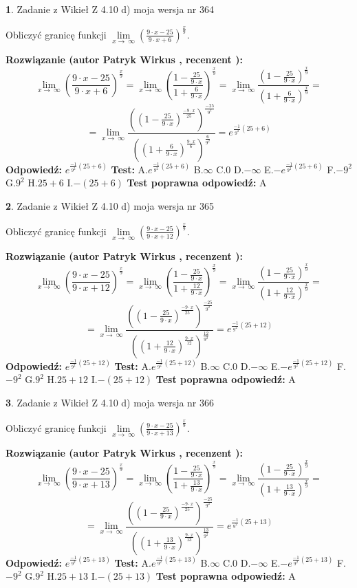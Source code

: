 \documentclass[12pt, a4paper]{article}
\theoremstyle{definition} %
\newtheorem{zad}{}
\newcommand{\zadStart}[1]{\begin{zad}#1\newline}
\newcommand{\zadStop}{\end{zad}}
\newcommand{\rozwStart}[2]{\noindent \textbf{Rozwiązanie (autor #1 , recenzent #2): }\newline}
\newcommand{\rozwStop}{\newline}
\newcommand{\odpStart}{\noindent \textbf{Odpowiedź:}\newline}
\newcommand{\odpStop}{\newline}
\newcommand{\testStart}{\noindent \textbf{Test:}\newline}
\newcommand{\testStop}{\newline}
\newcommand{\kluczStart}{\noindent \textbf{Test poprawna odpowiedź:}\newline}
\newcommand{\kluczStop}{\newline}
\begin{document}
\zadStart{Zadanie z Wikieł Z 4.10 d) moja wersja nr 364}


Obliczyć granicę funkcji  $\lim\limits_{x\to\ \infty}(\frac{9\cdot x-25}{9\cdot x+6})^{\frac{x}{9}}$.
\zadStop
\rozwStart{Patryk Wirkus}{}
$$\lim\limits_{x\to\ \infty}(\frac{9\cdot x-25}{9\cdot x+6})^{\frac{x}{9}} = \lim\limits_{x\to\ \infty}(\frac{1-\frac{25}{9\cdot x}}{1+\frac{6}{9\cdot x}})^{\frac{x}{9}}=\lim\limits_{x\to\ \infty}\frac{(1-\frac{25}{9\cdot x})^{\frac{x}{9}}}{(1+\frac{6}{9\cdot x})^{\frac{x}{9}}}=$$
$$=\lim\limits_{x\to\ \infty}\frac{((1-\frac{25}{9\cdot x})^{\frac{-9\cdot x}{25}})^{\frac{-25}{9^{2}}}}{((1+\frac{6}{9\cdot x})^{\frac{9\cdot x}{6}})^{\frac{6}{9^{2}}}}=e^{\frac{-1}{9^{2}}(25+6)}$$
\rozwStop
\odpStart
$e^{\frac{-1}{9^{2}}(25+6)}$
\odpStop
\testStart
A.$e^{\frac{-1}{9^{2}}(25+6)}$ B.$\infty$ C.$0$ D.$-\infty$ E.$-e^{\frac{-1}{9^{2}}(25+6)}$
F.$-9^{2}$ G.$9^{2}$
H.$25+6$
I.$-(25+6)$
\testStop
\kluczStart
A
\kluczStop



\zadStart{Zadanie z Wikieł Z 4.10 d) moja wersja nr 365}


Obliczyć granicę funkcji  $\lim\limits_{x\to\ \infty}(\frac{9\cdot x-25}{9\cdot x+12})^{\frac{x}{9}}$.
\zadStop
\rozwStart{Patryk Wirkus}{}
$$\lim\limits_{x\to\ \infty}(\frac{9\cdot x-25}{9\cdot x+12})^{\frac{x}{9}} = \lim\limits_{x\to\ \infty}(\frac{1-\frac{25}{9\cdot x}}{1+\frac{12}{9\cdot x}})^{\frac{x}{9}}=\lim\limits_{x\to\ \infty}\frac{(1-\frac{25}{9\cdot x})^{\frac{x}{9}}}{(1+\frac{12}{9\cdot x})^{\frac{x}{9}}}=$$
$$=\lim\limits_{x\to\ \infty}\frac{((1-\frac{25}{9\cdot x})^{\frac{-9\cdot x}{25}})^{\frac{-25}{9^{2}}}}{((1+\frac{12}{9\cdot x})^{\frac{9\cdot x}{12}})^{\frac{12}{9^{2}}}}=e^{\frac{-1}{9^{2}}(25+12)}$$
\rozwStop
\odpStart
$e^{\frac{-1}{9^{2}}(25+12)}$
\odpStop
\testStart
A.$e^{\frac{-1}{9^{2}}(25+12)}$ B.$\infty$ C.$0$ D.$-\infty$ E.$-e^{\frac{-1}{9^{2}}(25+12)}$
F.$-9^{2}$ G.$9^{2}$
H.$25+12$
I.$-(25+12)$
\testStop
\kluczStart
A
\kluczStop



\zadStart{Zadanie z Wikieł Z 4.10 d) moja wersja nr 366}


Obliczyć granicę funkcji  $\lim\limits_{x\to\ \infty}(\frac{9\cdot x-25}{9\cdot x+13})^{\frac{x}{9}}$.
\zadStop
\rozwStart{Patryk Wirkus}{}
$$\lim\limits_{x\to\ \infty}(\frac{9\cdot x-25}{9\cdot x+13})^{\frac{x}{9}} = \lim\limits_{x\to\ \infty}(\frac{1-\frac{25}{9\cdot x}}{1+\frac{13}{9\cdot x}})^{\frac{x}{9}}=\lim\limits_{x\to\ \infty}\frac{(1-\frac{25}{9\cdot x})^{\frac{x}{9}}}{(1+\frac{13}{9\cdot x})^{\frac{x}{9}}}=$$
$$=\lim\limits_{x\to\ \infty}\frac{((1-\frac{25}{9\cdot x})^{\frac{-9\cdot x}{25}})^{\frac{-25}{9^{2}}}}{((1+\frac{13}{9\cdot x})^{\frac{9\cdot x}{13}})^{\frac{13}{9^{2}}}}=e^{\frac{-1}{9^{2}}(25+13)}$$
\rozwStop
\odpStart
$e^{\frac{-1}{9^{2}}(25+13)}$
\odpStop
\testStart
A.$e^{\frac{-1}{9^{2}}(25+13)}$ B.$\infty$ C.$0$ D.$-\infty$ E.$-e^{\frac{-1}{9^{2}}(25+13)}$
F.$-9^{2}$ G.$9^{2}$
H.$25+13$
I.$-(25+13)$
\testStop
\kluczStart
A
\kluczStop
\end{document}
